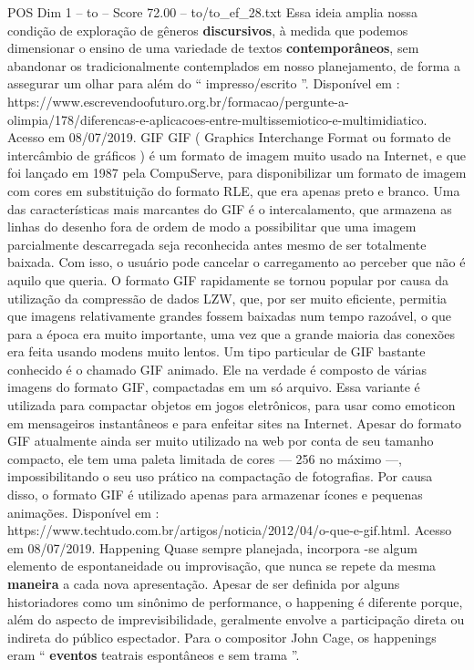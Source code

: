\begin{textsample}{POS Dim 1 – to – Score 72.00 – to/to\_ef\_28.txt}
Essa ideia amplia nossa condição de exploração de gêneros \textbf{discursivos}, à medida que podemos dimensionar o ensino de uma variedade de textos \textbf{contemporâneos}, sem abandonar os tradicionalmente contemplados em nosso planejamento, de forma a assegurar um olhar para além do “ impresso/escrito ”.
Disponível em : https://www.escrevendoofuturo.org.br/formacao/pergunte-a-olimpia/178/diferencas-e-aplicacoes-entre-multissemiotico-e-multimidiatico.
Acesso em 08/07/2019.
GIF GIF ( Graphics Interchange Format ou formato de intercâmbio de gráficos ) é um formato de imagem muito usado na Internet, e que foi lançado em 1987 pela CompuServe, para disponibilizar um formato de imagem com cores em substituição do formato RLE, que era apenas preto e branco.
Uma das características mais marcantes do GIF é o intercalamento, que armazena as linhas do desenho fora de ordem de modo a possibilitar que uma imagem parcialmente descarregada seja reconhecida antes mesmo de ser totalmente baixada.
Com isso, o usuário pode cancelar o carregamento ao perceber que não é aquilo que queria.
O formato GIF rapidamente se tornou popular por causa da utilização da compressão de dados LZW, que, por ser muito eficiente, permitia que imagens relativamente grandes fossem baixadas num tempo razoável, o que para a época era muito importante, uma vez que a grande maioria das conexões era feita usando modens muito lentos.
Um tipo particular de GIF bastante conhecido é o chamado GIF animado.
Ele na verdade é composto de várias imagens do formato GIF, compactadas em um só arquivo.
Essa variante é utilizada para compactar objetos em jogos eletrônicos, para usar como emoticon em mensageiros instantâneos e para enfeitar sites na Internet.
Apesar do formato GIF atualmente ainda ser muito utilizado na web por conta de seu tamanho compacto, ele tem uma paleta limitada de cores — 256 no máximo —, impossibilitando o seu uso prático na compactação de fotografias.
Por causa disso, o formato GIF é utilizado apenas para armazenar ícones e pequenas animações.
Disponível em : https://www.techtudo.com.br/artigos/noticia/2012/04/o-que-e-gif.html.
Acesso em 08/07/2019.
Happening Quase sempre planejada, incorpora -se algum elemento de espontaneidade ou improvisação, que nunca se repete da mesma \textbf{maneira} a cada nova apresentação.
Apesar de ser definida por alguns historiadores como um sinônimo de performance, o happening é diferente porque, além do aspecto de imprevisibilidade, geralmente envolve a participação direta ou indireta do público espectador.
Para o compositor John Cage, os happenings eram “ \textbf{eventos} teatrais espontâneos e sem trama ”.

\end{textsample}
